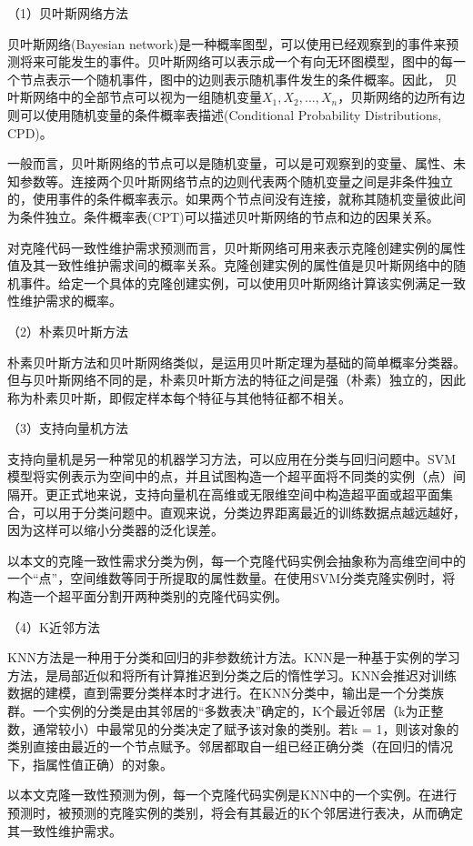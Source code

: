 （1）贝叶斯网络方法

贝叶斯网络(Bayesian network)是一种概率图型，可以使用已经观察到的事件来预测将来可能发生的事件\cite{friedman1997bayesian}。贝叶斯网络可以表示成一个有向无环图模型，图中的每一个节点表示一个随机事件，图中的边则表示随机事件发生的条件概率。因此， 贝叶斯网络中的全部节点可以视为一组随机变量{$X_{1},X_{2},...,X_{n}$}，贝斯网络的边所有边则可以使用随机变量的条件概率表描述(Conditional Probability Distributions, CPD)。

一般而言，贝叶斯网络的节点可以是随机变量，可以是可观察到的变量、属性、未知参数等。连接两个贝叶斯网络节点的边则代表两个随机变量之间是非条件独立的，使用事件的条件概率表示。如果两个节点间没有连接，就称其随机变量彼此间为条件独立。条件概率表(CPT)可以描述贝叶斯网络的节点和边的因果关系。

对克隆代码一致性维护需求预测而言，贝叶斯网络可用来表示克隆创建实例的属性值及其一致性维护需求间的概率关系。克隆创建实例的属性值是贝叶斯网络中的随机事件。给定一个具体的克隆创建实例，可以使用贝叶斯网络计算该实例满足一致性维护需求的概率。

（2）朴素贝叶斯方法

朴素贝叶斯方法和贝叶斯网络类似，是运用贝叶斯定理为基础的简单概率分类器。但与贝叶斯网络不同的是，朴素贝叶斯方法的特征之间是强（朴素）独立的，因此称为朴素贝叶斯，即假定样本每个特征与其他特征都不相关。 

（3）支持向量机方法

支持向量机是另一种常见的机器学习方法，可以应用在分类与回归问题中。SVM模型将实例表示为空间中的点，并且试图构造一个超平面将不同类的实例（点）间隔开。更正式地来说，支持向量机在高维或无限维空间中构造超平面或超平面集合，可以用于分类问题中。直观来说，分类边界距离最近的训练数据点越远越好，因为这样可以缩小分类器的泛化误差。

以本文的克隆一致性需求分类为例，每一个克隆代码实例会抽象称为高维空间中的一个“点”，空间维数等同于所提取的属性数量。在使用SVM分类克隆实例时，将构造一个超平面分割开两种类别的克隆代码实例。

（4）K近邻方法

KNN方法是一种用于分类和回归的非参数统计方法。KNN是一种基于实例的学习方法，是局部近似和将所有计算推迟到分类之后的惰性学习。KNN会推迟对训练数据的建模，直到需要分类样本时才进行。在KNN分类中，输出是一个分类族群。一个实例的分类是由其邻居的“多数表决”确定的，K个最近邻居（k为正整数，通常较小）中最常见的分类决定了赋予该对象的类别。若k = 1，则该对象的类别直接由最近的一个节点赋予。邻居都取自一组已经正确分类（在回归的情况下，指属性值正确）的对象。

以本文克隆一致性预测为例，每一个克隆代码实例是KNN中的一个实例。在进行预测时，被预测的克隆实例的类别，将会有其最近的K个邻居进行表决，从而确定其一致性维护需求。

